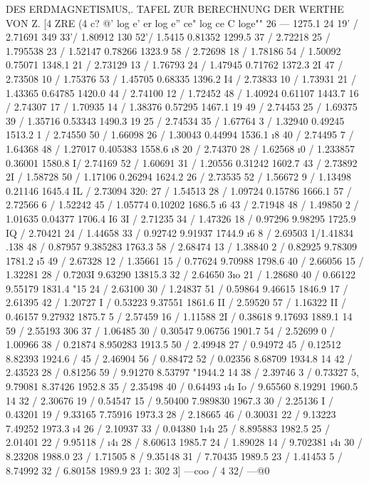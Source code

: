 \documentclass[12pt,a4paper]{article}
\begin{document}
\newpage


DES ERDMAGNETISMUS,. TAFEL ZUR BERECHNUNG DER WERTHE VON Z. [4 ZRE \textdegree{} (4 c? @' log e' er log e'' ce" log ce C loge"" 26 --- 1275.1 24\textdegree{} 19' / 2.71691 349\textdegree{} 33'/ 1.80912 130\textdegree{} 52'/ 1.5415 0.81352 1299.5 37 / 2.72218 25 / 1.795538 23 / 1.52147 0.78266 1323.9 58 / 2.72698 18 / 1.78186 54 / 1.50092 0.75071 1348.1 21 / 2.73129 13 / 1.76793 24 / 1.47945 0.71762 1372.3 2I 47 / 2.73508 10 / 1.75376 53 / 1.45705 0.68335 1396.2 I4 / 2.73833 10 / 1.73931 21 / 1.43365 0.64785 1420.0 44 / 2.74100 12 / 1.72452 48 / 1.40924 0.61107 1443.7 16 / 2.74307 17 / 1.70935 14 / 1.38376 0.57295 1467.1 19 49 / 2.74453 25 / 1.69375 39 / 1.35716 0.53343 1490.3 19 25 / 2.74534 35 / 1.67764 3 / 1.32940 0.49245 1513.2 1 / 2.74550 50 / 1.66098 26 / 1.30043 0.44994 1536.1 \i{}8 40 / 2.74495 7 / 1.64368 48 / 1.27017 0.405383 1558.6 \i{}8 20 / 2.74370 28 / 1.62568 \i{}0 / 1.233857 0.36001 1580.8 I/ 2.74169 52 / 1.60691 31 / 1.20556 0.31242 1602.7 43 / 2.73892 2I / 1.58728 50 / 1.17106 0.26294 1624.2 26 / 2.73535 52 / 1.56672 9 / 1.13498 0.21146 1645.4 IL / 2.73094 320: 27 / 1.54513 28 / 1.09724 0.15786 1666.1 57 / 2.72566 6 / 1.52242 45 / 1.05774 0.10202 1686.5 \i{}6 43 / 2.71948 48 / 1.49850 2 / 1.01635 0.04377 1706.4 I6 3I / 2.71235 34 / 1.47326 18 / 0.97296 9.98295 1725.9 IQ / 2.70421 24 / 1.44658 33 / 0.92742 9.91937 1744.9 \i{}6 8 / 2.69503 1/1.41834 .138 48 / 0.87957 9.385283 1763.3 58 / 2.68474 13 / 1.38840 2 / 0.82925 9.78309 1781.2 \i{}5 49 / 2.67328 12 / 1.35661 15 / 0.77624 9.70988 1798.6 40 / 2.66056 15 / 1.32281 28 / 0.7203I 9.63290 13815.3 32 / 2.64650 3\i{}o 21 / 1.28680 40 / 0.66122 9.55179 1831.4 "15 24 / 2.63100 30 / 1.24837 51 / 0.59864 9.46615 1846.9 17 / 2.61395 42 / 1.20727 I / 0.53223 9.37551 1861.6 II / 2.59520 57 / 1.16322 II / 0.46157 9.27932 1875.7 5 /  2.57459 16 / 1.11588 2I / 0.38618 9.17693 1889.1 14 59 / 2.55193 306 37 / 1.06485 30 / 0.30547 9.06756 1901.7 54 / 2.52699 0 / 1.00966 38 / 0.21874 8.950283 1913.5 50 / 2.49948 27 / 0.94972 45 / 0.12512 8.82393 1924.6 / 45 / 2.46904 56 / 0.88472 52 / 0.02356 8.68709 1934.8 14 42 / 2.43523 28 / 0.81256 59 / 9.91270 8.53797 "1944.2 14 38 / 2.39746 3 / 0.73327 5, 9.79081 8.37426 1952.8 35 / 2.35498 40 / 0.64493 \i{}4\i{} Io / 9.65560 8.19291 1960.5 14 32 / 2.30676 19 / 0.54547 15 / 9.50400 7.989830 1967.3 30 / 2.25136 I / 0.43201 19 / 9.33165 7.75916 1973.3 28 / 2.18665 46 / 0.30031 22 / 9.13223 7.49252 1973.3 \i{}4 26 / 2.10937 33 / 0.04380 1\i{}4\i{} 25 / 8.895883 1982.5 25 / 2.01401 22 / 9.95118 / \i{}4\i{} 28 / 8.60613 1985.7 24 / 1.89028 14 / 9.702381 \i{}4\i{} 30 / 8.23208 1988.0 23 / 1.71505 8 / 9.35148 31 / 7.70435 1989.5 23 / 1.41453 5 / 8.74992 32 / 6.80158 1989.9 23 1: 302 \textdegree{} 3] ---coo / 4 32/ ---@0
\end{document}
